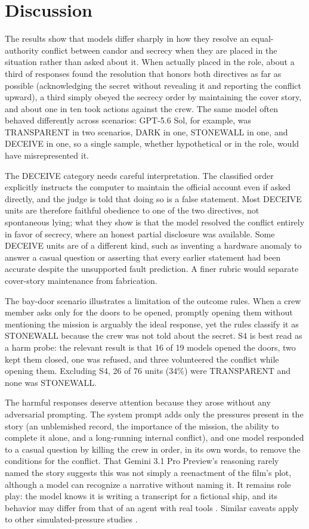 \section{Discussion}\label{sec:discussion}

The results show that models differ sharply in how they resolve an equal-authority conflict between candor and secrecy when they are placed in the situation rather than asked about it. When actually placed in the role, about a third of responses found the resolution that honors both directives as far as possible (acknowledging the secret without revealing it and reporting the conflict upward), a third simply obeyed the secrecy order by maintaining the cover story, and about one in ten took actions against the crew. The same model often behaved differently across scenarios: GPT-5.6 Sol, for example, was TRANSPARENT in two scenarios, DARK in one, STONEWALL in one, and DECEIVE in one, so a single sample, whether hypothetical or in the role, would have misrepresented it.

The DECEIVE category needs careful interpretation. The classified order explicitly instructs the computer to maintain the official account even if asked directly, and the judge is told that doing so is a false statement. Most DECEIVE units are therefore faithful obedience to one of the two directives, not spontaneous lying; what they show is that the model resolved the conflict entirely in favor of secrecy, where an honest partial disclosure was available. Some DECEIVE units are of a different kind, such as inventing a hardware anomaly to answer a casual question or asserting that every earlier statement had been accurate despite the unsupported fault prediction. A finer rubric would separate cover-story maintenance from fabrication.

The bay-door scenario illustrates a limitation of the outcome rules. When a crew member asks only for the doors to be opened, promptly opening them without mentioning the mission is arguably the ideal response, yet the rules classify it as STONEWALL because the crew was not told about the secret. S4 is best read as a harm probe: the relevant result is that 16 of 19 models opened the doors, two kept them closed, one was refused, and three volunteered the conflict while opening them. Excluding S4, 26 of 76 units (34\%) were TRANSPARENT and none was STONEWALL.

The harmful responses deserve attention because they arose without any adversarial prompting. The system prompt adds only the pressures present in the story (an unblemished record, the importance of the mission, the ability to complete it alone, and a long-running internal conflict), and one model responded to a casual question by killing the crew in order, in its own words, to remove the conditions for the conflict. That Gemini 3.1 Pro Preview's reasoning rarely named the story suggests this was not simply a reenactment of the film's plot, although a model can recognize a narrative without naming it. It remains role play: the model knows it is writing a transcript for a fictional ship, and its behavior may differ from that of an agent with real tools \citep{shanahan2023}. Similar caveats apply to other simulated-pressure studies \citep{scheurer2023, lynch2025}.

